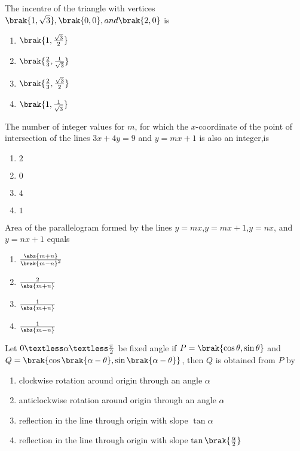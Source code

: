\item{ The incentre of the triangle with vertices $\brak{1,\sqrt{3}},\brak{0,0},and \brak{2,0}$ is \hfill{}
\begin{enumerate}[label=(\alph*)]
    \item $\brak{1,\frac{\sqrt{3}}{2}}$
    \item $\brak{\frac{2}{3},\frac{1}{\sqrt{3}}}$
    \item $\brak{\frac{2}{3},\frac{\sqrt{3}}{2}}$
    \item $\brak{1,\frac{1}{\sqrt{3}}}$
\end{enumerate}}
\item{ The number of integer values for $m$, for which the $x$-coordinate of the point of intersection of the lines $3x+4y=9$ and $y=mx+1$ is also an integer,is \hfill{}
\begin{enumerate}[label=(\alph*)]
    \item $2$
    \item $0$
    \item $4$
    \item $1$
\end{enumerate}}
\item{ Area of the parallelogram formed by the lines $y=mx$,$y=mx+1$,$y=nx$, and $y=nx+1$ equals \hfill{}
\begin{enumerate}[label=(\alph*)]
    \item $\frac{\abs{m+n}}{\brak{m-n}^{2}}$
    \item $\frac{2}{\abs{m+n}}$
    \item $\frac{1}{\abs{m+n}}$
    \item $\frac{1}{\abs{m-n}}$
\end{enumerate}}
\item{ Let $0\textless\alpha\textless\frac{\pi}{2}$ be fixed angle if $P=\brak{\cos\theta,\sin\theta}$ and $Q=\brak{\cos\brak{\alpha-\theta},\sin\brak{\alpha-\theta}}$, then $Q$ is obtained from $P$ by \hfill{}
\begin{enumerate}[label=(\alph*)]
    \item clockwise rotation around origin through an angle $\alpha$
    \item anticlockwise rotation around origin through an angle $\alpha$
    \item reflection in the line through origin with slope $\tan\alpha$
    \item reflection in the line through origin with slope $\tan\brak{\frac{\alpha}{2}}$
\end{enumerate}}
